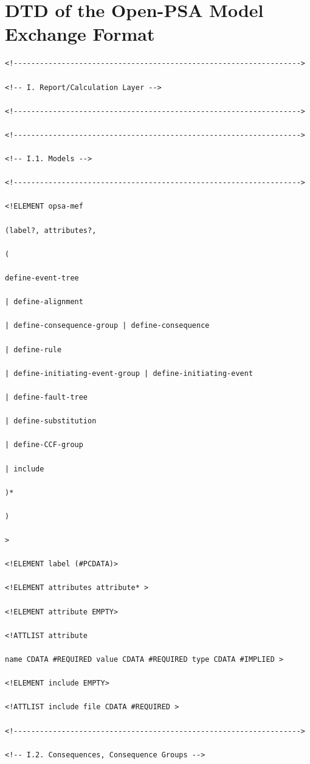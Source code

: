 \documentclass[11pt]{article}
\begin{document}
\section{DTD of the Open-PSA Model Exchange Format}
\label{sec:org05b6144}


\lstset{language=XML,label= ,caption= ,captionpos=b,numbers=none}
\begin{lstlisting}
<!------------------------------------------------------------------>

<!-- I. Report/Calculation Layer -->

<!------------------------------------------------------------------>

<!------------------------------------------------------------------>

<!-- I.1. Models -->

<!------------------------------------------------------------------>

<!ELEMENT opsa-mef

(label?, attributes?,

(

define-event-tree

| define-alignment

| define-consequence-group | define-consequence

| define-rule

| define-initiating-event-group | define-initiating-event

| define-fault-tree

| define-substitution

| define-CCF-group

| include

)*

)

>

<!ELEMENT label (#PCDATA)>

<!ELEMENT attributes attribute* >

<!ELEMENT attribute EMPTY>

<!ATTLIST attribute

name CDATA #REQUIRED value CDATA #REQUIRED type CDATA #IMPLIED >

<!ELEMENT include EMPTY>

<!ATTLIST include file CDATA #REQUIRED >

<!------------------------------------------------------------------>

<!-- I.2. Consequences, Consequence Groups -->


\end{lstlisting}
\end{document}

